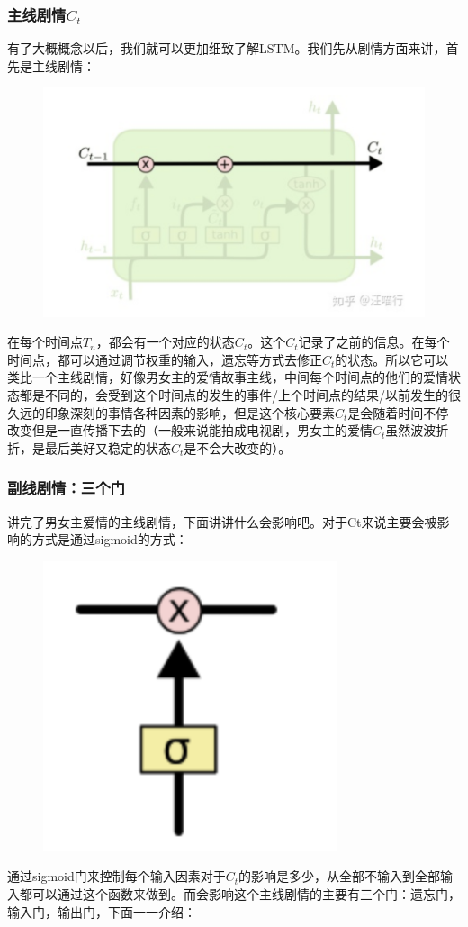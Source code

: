 \documentclass[12pt]{article}
\begin{document}
\subsubsection{主线剧情$C_t$}
有了大概概念以后，我们就可以更加细致了解LSTM。我们先从剧情方面来讲，首先是主线剧情：
\begin{figure}[H]
    \centering
    \includegraphics[width=.6\textwidth]{fig/LSTM_Main_Stream.png}
\end{figure}
在每个时间点$T_n$，都会有一个对应的状态$C_t$。这个$C_t$记录了之前的信息。在每个时间点，都可以通过调节权重的输入，遗忘等方式去修正$C_t$的状态。所以它可以类比一个主线剧情，好像男女主的爱情故事主线，中间每个时间点的他们的爱情状态都是不同的，会受到这个时间点的发生的事件/上个时间点的结果/以前发生的很久远的印象深刻的事情各种因素的影响，但是这个核心要素$C_t$是会随着时间不停改变但是一直传播下去的（一般来说能拍成电视剧，男女主的爱情$C_t$虽然波波折折，是最后美好又稳定的状态$C_t$是不会大改变的）。

\subsubsection{副线剧情：三个门}
讲完了男女主爱情的主线剧情，下面讲讲什么会影响吧。对于Ct来说主要会被影响的方式是通过sigmoid的方式：
\begin{figure}[H]
    \centering
    \includegraphics[width=.3\textwidth]{fig/LSTM_Gate_Sigmoid.png}
\end{figure}

通过sigmoid门来控制每个输入因素对于$C_t$的影响是多少，从全部不输入到全部输入都可以通过这个函数来做到。而会影响这个主线剧情的主要有三个门：遗忘门，输入门，输出门，下面一一介绍：
\end{document}
